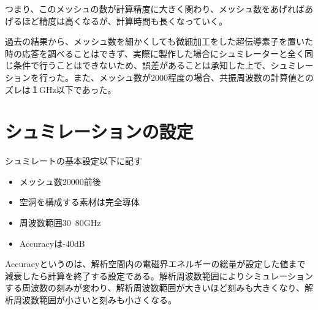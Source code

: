 つまり、このメッシュの数が計算精度に大きく関わり、メッシュ数をあげればあげるほど精度は高くなるが、計算時間も長くなっていく。

過去の結果から、メッシュ数を細かくしても微細加工をした超伝導素子を置いた時の応答を調べることはできず、実際に製作した場合にシュミレーターと全く同じ条件で行うことはできないため、誤差があることは承知した上で、シュミレーションを行った。また、メッシュ数が2000程度の場合、共振周波数の計算値とのズレは１GHz以下であった。

\section{シュミレーションの設定}
シュミレートの基本設定以下に記す

\begin{itemize}
  \item メッシュ数20000前後
  \item 空洞を構成する素材は完全導体
  \item 周波数範囲30~80GHz
  \item Accuracyは-40dB
\end{itemize}

Accuracyというのは、解析空間内の電磁界エネルギーの総量が設定した値まで減衰したら計算を終了する設定である。解析周波数範囲によりシミュレーションする周波数の刻みが変わり、解析周波数範囲が大きいほど刻みも大きくなり、解析周波数範囲が小さいと刻みも小さくなる。
